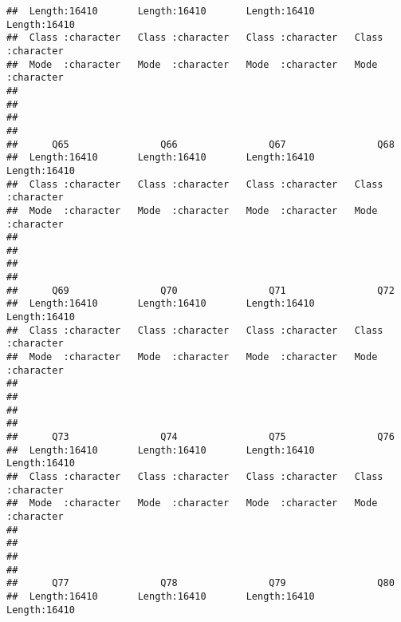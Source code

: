 \documentclass[
]{article}
\begin{document}
\begin{verbatim}
##  Length:16410       Length:16410       Length:16410       Length:16410      
##  Class :character   Class :character   Class :character   Class :character  
##  Mode  :character   Mode  :character   Mode  :character   Mode  :character  
##                                                                             
##                                                                             
##                                                                             
##                                                                             
##      Q65                Q66                Q67                Q68           
##  Length:16410       Length:16410       Length:16410       Length:16410      
##  Class :character   Class :character   Class :character   Class :character  
##  Mode  :character   Mode  :character   Mode  :character   Mode  :character  
##                                                                             
##                                                                             
##                                                                             
##                                                                             
##      Q69                Q70                Q71                Q72           
##  Length:16410       Length:16410       Length:16410       Length:16410      
##  Class :character   Class :character   Class :character   Class :character  
##  Mode  :character   Mode  :character   Mode  :character   Mode  :character  
##                                                                             
##                                                                             
##                                                                             
##                                                                             
##      Q73                Q74                Q75                Q76           
##  Length:16410       Length:16410       Length:16410       Length:16410      
##  Class :character   Class :character   Class :character   Class :character  
##  Mode  :character   Mode  :character   Mode  :character   Mode  :character  
##                                                                             
##                                                                             
##                                                                             
##                                                                             
##      Q77                Q78                Q79                Q80           
##  Length:16410       Length:16410       Length:16410       Length:16410      

\end{verbatim}
\end{document}

